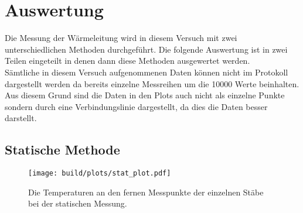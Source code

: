 \section{Auswertung}

    \noindent Die Messung der Wärmeleitung wird in diesem Versuch mit zwei unterschiedlichen Methoden durchgeführt. Die folgende Auswertung ist 
    in zwei Teilen eingeteilt in denen dann diese Methoden ausgewertet werden.\\ Sämtliche in diesem Versuch aufgenommenen Daten können nicht im 
    Protokoll dargestellt werden da bereits einzelne Messreihen um die 10000 Werte beinhalten. Aus diesem Grund sind die Daten in den Plots auch 
    nicht als einzelne Punkte sondern durch eine Verbindungslinie dargestellt, da dies die Daten besser darstellt.

    \subsection{Statische Methode}

      \begin{figure}[H]
          \centering
          \texttt{[image: build/plots/stat\_plot.pdf]}
          \caption{Die Temperaturen an den fernen Messpunkte der einzelnen Stäbe bei der statischen Messung. }
          \label{fig:plot_stat}
      \end{figure}
    
